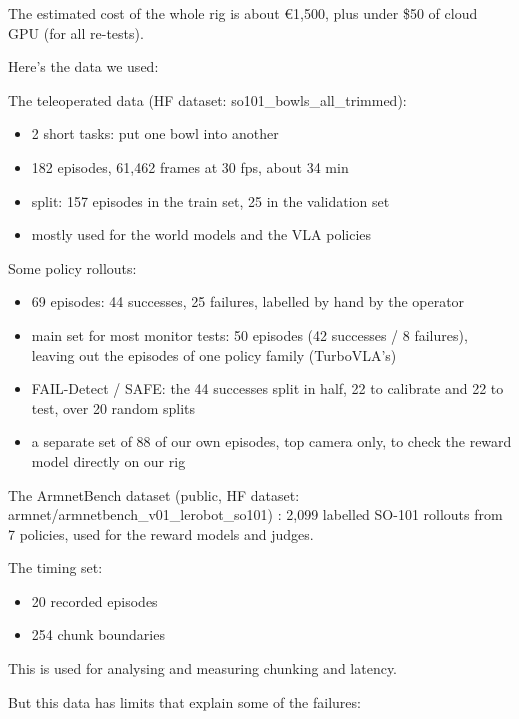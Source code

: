 \documentclass[10pt,twocolumn]{article}
\begin{document}
The estimated cost of the whole rig is about €1,500, plus under \$50 of cloud GPU (for all re-tests).


Here's the data we used:


The teleoperated data (HF dataset: so101\_bowls\_all\_trimmed):


\begin{itemize}\setlength{\itemsep}{0pt}\setlength{\parskip}{0pt}\footnotesize
\item 2 short tasks: put one bowl into another
\item 182 episodes, 61,462 frames at 30 fps, about 34 min
\item split: 157 episodes in the train set, 25 in the validation set
\item mostly used for the world models and the VLA policies
\end{itemize}


Some policy rollouts:


\begin{itemize}\setlength{\itemsep}{0pt}\setlength{\parskip}{0pt}\footnotesize
\item 69 episodes: 44 successes, 25 failures, labelled by hand by the operator
\item main set for most monitor tests: 50 episodes (42 successes / 8 failures), leaving out the episodes of one policy family (TurboVLA's)
\item FAIL-Detect / SAFE: the 44 successes split in half, 22 to calibrate and 22 to test, over 20 random splits
\item a separate set of 88 of our own episodes, top camera only, to check the reward model directly on our rig
\end{itemize}


The ArmnetBench dataset (public, HF dataset: armnet/armnetbench\_v01\_lerobot\_so101) \citep{arxiv260724481}: 2,099 labelled SO-101 rollouts from 7 policies, used for the reward models and judges.


The timing set:


\begin{itemize}\setlength{\itemsep}{0pt}\setlength{\parskip}{0pt}\footnotesize
\item 20 recorded episodes
\item 254 chunk boundaries
\end{itemize}


This is used for analysing and measuring chunking and latency.


But this data has limits that explain some of the failures:
\end{document}
